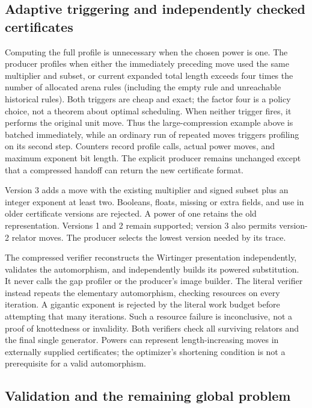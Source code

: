 \subsection{Adaptive triggering and independently checked certificates}

Computing the full profile is unnecessary when the chosen power is one.
The producer profiles when either the immediately preceding move used the
same multiplier and subset, or current expanded total length exceeds four
times the number of allocated arena rules (including the empty rule and
unreachable historical rules). Both triggers are cheap and exact; the
factor four is a policy choice, not a theorem about optimal scheduling.
When neither trigger fires, it performs the original unit move. Thus the
large-compression example above is batched immediately, while an ordinary
run of repeated moves triggers profiling on its second step. Counters
record profile calls, actual power moves, and maximum exponent bit length.
The explicit producer remains unchanged except that a compressed handoff
can return the new certificate format.

Version 3 adds a  move with the existing multiplier
and signed subset plus an integer exponent at least two. Booleans, floats,
missing or extra fields, and use in older certificate versions are rejected.
A power of one retains the old  representation. Versions
1 and 2 remain supported; version 3 also permits version-2 relator moves.
The producer selects the lowest version needed by its trace.

The compressed verifier reconstructs the Wirtinger presentation independently,
validates the automorphism, and independently builds its powered substitution.
It never calls the gap profiler or the producer's image builder. The literal
verifier instead repeats the elementary automorphism, checking resources on
every iteration. A gigantic exponent is rejected by the literal work budget
before attempting that many iterations. Such a resource failure is
inconclusive, not a proof of knottedness or invalidity. Both verifiers check
all surviving relators and the final single generator. Powers can represent
length-increasing moves in externally supplied certificates; the optimizer's
shortening condition is not a prerequisite for a valid automorphism.

\subsection{Validation and the remaining global problem}

